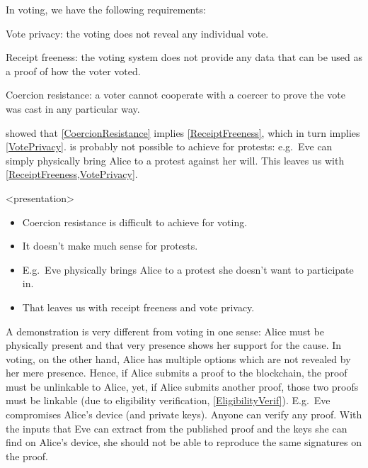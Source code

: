 In voting, we have the following requirements:
\begin{frame}
\begin{requirements}[P]
\item\label{VotePrivacy} Vote privacy: the voting does not reveal any 
  individual vote.
\item\label{ReceiptFreeness} Receipt freeness: the voting system does not 
  provide any data that can be used as a proof of how the voter voted.
\item\label{CoercionResistance} Coercion resistance: a voter cannot cooperate 
  with a coercer to prove the vote was cast in any particular way.
\end{requirements}
\pause
{}
\end{frame}
\Textcite{VerifyingPrivacyPropertiesOfVotingProtocols} showed that 
\cref{CoercionResistance} implies \cref{ReceiptFreeness}, which in turn implies
\cref{VotePrivacy}.
 is probably not possible to achieve for protests:
e.g.\ Eve can simply physically bring Alice to a protest against her will.
This leaves us with \cref{ReceiptFreeness,VotePrivacy}.

\begin{frame}<presentation>
  \begin{remark}
    \begin{itemize}
      \item Coercion resistance is difficult to achieve for voting.
      \item It doesn't make much sense for protests.
      \item E.g.\ Eve physically brings Alice to a protest she doesn't want to 
        participate in.
      \item That leaves us with receipt freeness and vote privacy.
    \end{itemize}
  \end{remark}
\end{frame}

A demonstration is very different from voting in one sense: Alice must be 
physically present and that very presence shows her support for the cause.
In voting, on the other hand, Alice has multiple options which are not revealed
by her mere presence.
Hence, if Alice submits a proof to the blockchain, the proof must be 
unlinkable to Alice, yet, if Alice submits another proof, those two proofs must 
be linkable (due to eligibility verification, \cref{EligibilityVerif}).
E.g.\ Eve compromises Alice's device (and private keys).
Anyone can verify any proof.
With the inputs that Eve can extract from the published proof and the keys she 
can find on Alice's device, she should not be able to reproduce the same 
signatures on the proof.

